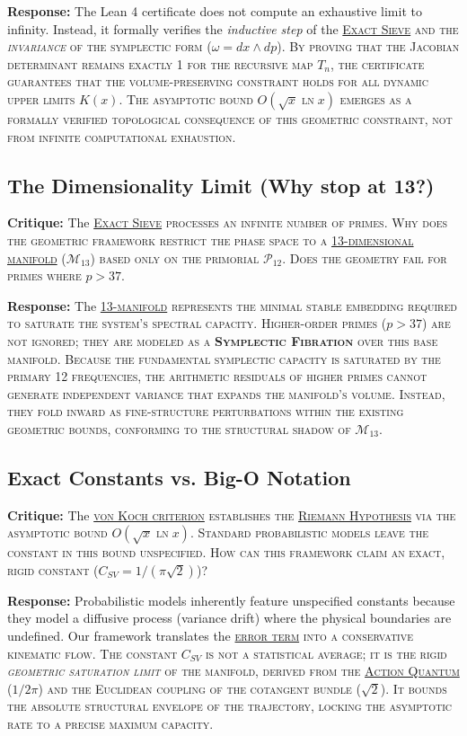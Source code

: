\documentclass[sn-mathphys-num, pdflatex]{sn-jnl}
\newcommand{\gterm}[2]{\begingroup\normalfont\scshape\hyperlink{#1}{#2}\endgroup}
\begin{document}
\textbf{Response:} The Lean 4 certificate does not compute an exhaustive limit to infinity. Instead, it formally verifies the \textit{inductive step} of the \gterm{exact_sieve}{Exact Sieve} and the \textit{invariance} of the symplectic form ($\omega = dx \wedge dp$). By proving that the Jacobian determinant remains exactly 1 for the recursive map $T_n$, the certificate guarantees that the volume-preserving constraint holds for all dynamic upper limits $K(x)$. The asymptotic bound $O(\sqrt{x} \ln x)$ emerges as a formally verified topological consequence of this geometric constraint, not from infinite computational exhaustion.

\subsection*{The Dimensionality Limit (Why stop at 13?)}
\textbf{Critique:} The \gterm{exact_sieve}{Exact Sieve} processes an infinite number of primes. Why does the geometric framework restrict the phase space to a \gterm{m13}{13-dimensional manifold} ($\mathcal{M}_{13}$) based only on the primorial $\mathcal{P}_{12}$. Does the geometry fail for primes where $p > 37$.

\textbf{Response:} The \gterm{m13}{13-manifold} represents the minimal stable embedding required to saturate the system's spectral capacity. Higher-order primes ($p > 37$) are not ignored; they are modeled as a \textbf{Symplectic Fibration} over this base manifold. Because the fundamental symplectic capacity is saturated by the primary 12 frequencies, the arithmetic residuals of higher primes cannot generate independent variance that expands the manifold's volume. Instead, they fold inward as fine-structure perturbations within the existing geometric bounds, conforming to the structural shadow of \gterm{m13}{$\mathcal{M}_{13}$}.

\subsection*{Exact Constants vs. Big-O Notation}
\textbf{Critique:} The \gterm{von_koch}{von Koch criterion} establishes the \gterm{rh}{Riemann Hypothesis} via the asymptotic bound $O(\sqrt{x} \ln x)$. Standard probabilistic models leave the constant in this bound unspecified. How can this framework claim an exact, rigid constant (\gterm{csv}{$C_{SV} = 1/(\pi\sqrt{2})$})?

\textbf{Response:} Probabilistic models inherently feature unspecified constants because they model a diffusive process (variance drift) where the physical boundaries are undefined. Our framework translates the \gterm{error_term}{error term} into a conservative kinematic flow. The constant \gterm{csv}{$C_{SV}$} is not a statistical average; it is the rigid \textit{geometric saturation limit} of the manifold, derived from the \gterm{action_quantum}{Action Quantum} ($1/2\pi$) and the Euclidean coupling of the cotangent bundle ($\sqrt{2}$). It bounds the absolute structural envelope of the trajectory, locking the asymptotic rate to a precise maximum capacity.
\end{document}
